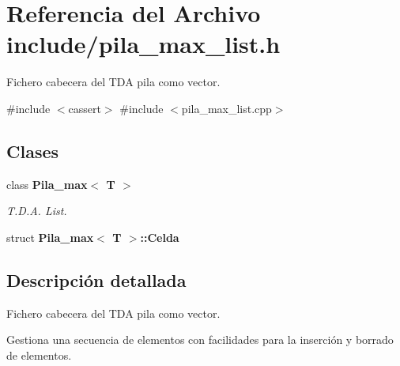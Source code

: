 \section{Referencia del Archivo include/pila\+\_\+max\+\_\+list.h}
\label{pila__max__list_8h}


Fichero cabecera del T\+DA pila como vector.  


{\ttfamily \#include $<$cassert$>$}\newline
{\ttfamily \#include $<$pila\+\_\+max\+\_\+list.\+cpp$>$}\newline
\subsection*{Clases}
\begin{DoxyCompactItemize}
\item 
class {\bf Pila\+\_\+max$<$ T $>$}
\begin{DoxyCompactList}\small\item\em T.\+D.\+A. List. \end{DoxyCompactList}\item 
struct {\bf Pila\+\_\+max$<$ T $>$\+::\+Celda}
\end{DoxyCompactItemize}


\subsection{Descripción detallada}
Fichero cabecera del T\+DA pila como vector. 

Gestiona una secuencia de elementos con facilidades para la inserción y borrado de elementos. 